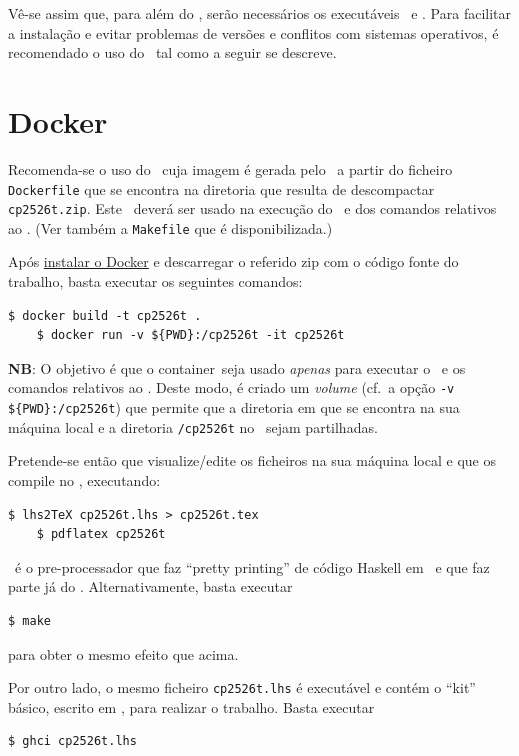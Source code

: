 \documentclass[11pt, a4paper, fleqn]{article}
\begin{document}
        \esquema

Vê-se assim que, para além do \GHCi, serão necessários os executáveis \PdfLatex\ e
\LhsToTeX. Para facilitar a instalação e evitar problemas de versões e
conflitos com sistemas operativos, é recomendado o uso do \Docker\ tal como
a seguir se descreve.

\section{Docker} \label{sec:docker}

Recomenda-se o uso do \container\ cuja imagem é gerada pelo \Docker\ a partir do ficheiro
\texttt{Dockerfile} que se encontra na diretoria que resulta de descompactar
\texttt{cp2526t.zip}. Este \container\ deverá ser usado na execução
do \GHCi\ e dos comandos relativos ao \Latex. (Ver também a \texttt{Makefile}
que é disponibilizada.)

Após \href{https://docs.docker.com/engine/install/}{instalar o Docker} e
descarregar o referido zip com o código fonte do trabalho,
basta executar os seguintes comandos:
\begin{Verbatim}[fontsize=\small]
    $ docker build -t cp2526t .
    $ docker run -v ${PWD}:/cp2526t -it cp2526t
\end{Verbatim}
\textbf{NB}: O objetivo é que o container\ seja usado \emph{apenas}
para executar o \GHCi\ e os comandos relativos ao \Latex.
Deste modo, é criado um \textit{volume} (cf.\ a opção \texttt{-v \$\{PWD\}:/cp2526t})
que permite que a diretoria em que se encontra na sua máquina local
e a diretoria \texttt{/cp2526t} no \container\ sejam partilhadas.

Pretende-se então que visualize/edite os ficheiros na sua máquina local e que
os compile no \container, executando:
\begin{Verbatim}[fontsize=\small]
    $ lhs2TeX cp2526t.lhs > cp2526t.tex
    $ pdflatex cp2526t
\end{Verbatim}
\LhsToTeX\ é o pre-processador que faz ``pretty printing'' de código Haskell
em \Latex\ e que faz parte já do \container. Alternativamente, basta executar
\begin{Verbatim}[fontsize=\small]
    $ make
\end{Verbatim}
para obter o mesmo efeito que acima.

Por outro lado, o mesmo ficheiro \texttt{cp2526t.lhs} é executável e contém
o ``kit'' básico, escrito em \Haskell, para realizar o trabalho. Basta executar
\begin{Verbatim}[fontsize=\small]
    $ ghci cp2526t.lhs
\end{Verbatim}
\end{document}
